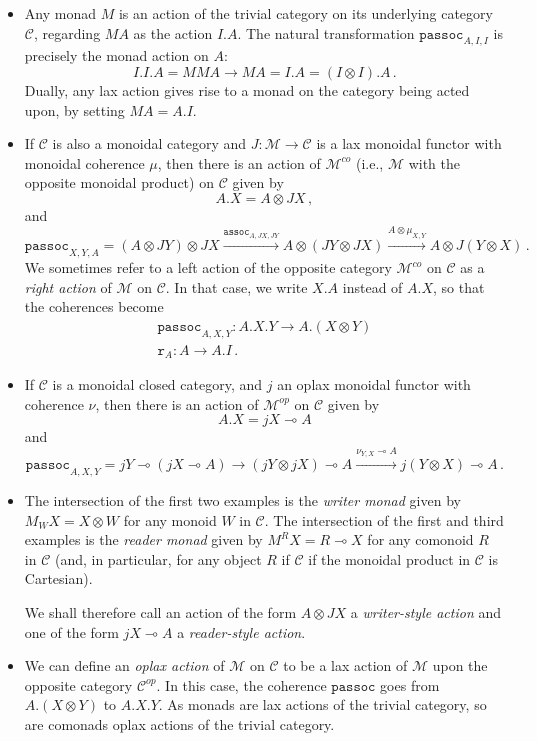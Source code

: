 \documentclass{svproc}
\newcommand\C{\mathcal{C}}
\newcommand\M{\mathcal{M}}
\newcommand{\passoc}{\texttt{passoc}}
\newcommand{\assoc}{\texttt{assoc}}
\newcommand\tensor\otimes
\newcommand\run{\texttt{r}}
\renewcommand\implies\multimap
\newcommand*\from{\colon}
\newcommand{\0}{{\mathtt{0}}} \newcommand{\com}{{\mathtt{com}}}
\begin{document}
\begin{example}
  \begin{itemize}
    \item Any monad $M$ is an action of the trivial category on its underlying category $\C$, regarding $MA$ as the action $I.A$.
      The natural transformation $\passoc_{A,I,I}$ is precisely the monad action on $A$:
      \[
        I.I.A = MMA \to M A = I.A = (I\tensor I).A\,.
        \]
      Dually, any lax action gives rise to a monad on the category being acted upon, by setting $MA = A.I$.
    \item If $\C$ is also a monoidal category and $J\from \M\to \C$ is a lax monoidal functor with monoidal coherence $\mu$, then there is an action of $\M^{co}$ (i.e., $\M$ with the opposite monoidal product) on $\C$ given by
      \[
        A.X = A \tensor JX\,,
        \]
      and
      \[
        \passoc_{X,Y,A}=
        (A \tensor JY) \tensor JX \xrightarrow{\assoc_{A,JX,JY}}
        A \tensor (JY \tensor JX) \xrightarrow{A \tensor \mu_{X,Y}}
        A \tensor J(Y\tensor X)\,.
        \]
      We sometimes refer to a left action of the opposite category $\M^{co}$ on $\C$ as a \emph{right action} of $\M$ on $\C$.  
      In that case, we write $X.A$ instead of $A.X$, so that the coherences become
      \begin{gather*}
        \passoc_{A,X,Y}\from A.X.Y \to A.(X\tensor Y)\\
        \run_A\from A \to A.I\,.
      \end{gather*}

    \item If $\C$ is a monoidal closed category, and $j$ an oplax monoidal functor with coherence $\nu$, then there is an action of $\M^{op}$ on $\C$ given by
      \[
        A.X = jX \implies A
        \]
      and
      \[
        \passoc_{A,X,Y}=jY \implies (jX \implies A) \to
        (jY \tensor jX) \implies A \xrightarrow{\nu_{Y,X}\implies A}
        j(Y \tensor X) \implies A\,.
        \]
    \item The intersection of the first two examples is the \emph{writer monad} given by $M_WX = X\tensor W$ for any monoid $W$ in $\C$.  
      The intersection of the first and third examples is the \emph{reader monad} given by $M^RX = R \implies X$ for any comonoid $R$ in $\C$ (and, in particular, for any object $R$ if $\C$ if the monoidal product in $\C$ is Cartesian).
      
      We shall therefore call an action of the form $A \tensor JX$ a \emph{writer-style action} and one of the form $jX \implies A$ a \emph{reader-style action}.
    \item We can define an \emph{oplax action} of $\M$ on $\C$ to be a lax action of $\M$ upon the opposite category $\C^{op}$.  
      In this case, the coherence $\passoc$ goes from $A.(X\tensor Y)$ to $A.X.Y$.  
      As monads are lax actions of the trivial category, so are comonads oplax actions of the trivial category.


\end{itemize}
\end{example}
\end{document}
